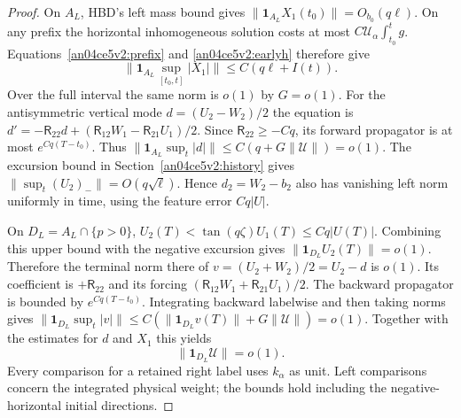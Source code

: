 \documentclass[11pt]{article}
\begin{document}
\begin{proof}
On $A_L$, HBD's left mass bound gives $\|\mathbf1_{A_L}X_1(t_0)\|=O_{b_0}(q\ell)$. On any prefix the horizontal inhomogeneous solution costs at most $C\mathcal U_\alpha\int_{t_0}^t g$. Equations~\eqref{an04ce5v2:prefix} and \eqref{an04ce5v2:earlyh} therefore give
\begin{equation}\label{an04ce5v2:left}
 \|\mathbf1_{A_L}\sup_{[t_0,t]} |X_1|\|\le C(q\ell+I(t)).
\end{equation}
Over the full interval the same norm is $o(1)$ by $G=o(1)$. For the antisymmetric vertical mode $d=(U_2-W_2)/2$ the equation is $d'=-\mathsf R_{22}d+(\mathsf R_{12} W_1-\mathsf R_{21}U_1)/2$. Since $\mathsf R_{22}\ge-Cq$, its forward propagator is at most $e^{Cq(T-t_0)}$. Thus $\|\mathbf1_{A_L}\sup_t|d|\|\le C(q+G\|\mathcal U\|)=o(1)$. The excursion bound in Section~\ref{an04ce5v2:history} gives $\|\sup_t (U_2)_-\|=O(q\sqrt\ell)$. Hence $d_2=W_2-b_2$ also has vanishing left norm uniformly in time, using the feature error $Cq|U|$.

On $D_L=A_L\cap\{p>0\}$, $U_2(T)<\tan(q\zeta) U_1(T)\le Cq|U(T)|$. Combining this upper bound with the negative excursion gives $\|\mathbf1_{D_L}U_2(T)\|=o(1)$. Therefore the terminal norm there of $v=(U_2+W_2)/2=U_2-d$ is $o(1)$. Its coefficient is $+\mathsf R_{22}$ and its forcing $(\mathsf R_{12}W_1+\mathsf R_{21}U_1)/2$. The backward propagator is bounded by $e^{Cq(T-t_0)}$. Integrating backward labelwise and then taking norms gives $\|\mathbf1_{D_L}\sup_t|v|\|\le C(\|\mathbf1_{D_L}v(T)\|+G\|\mathcal U\|)=o(1)$. Together with the estimates for $d$ and $X_1$ this yields
\begin{equation}\label{an04ce5v2:activeleft}
 \|\mathbf1_{D_L}\mathcal U\|=o(1).
\end{equation}
Every comparison for a retained right label uses $k_\alpha$ as unit. Left comparisons concern the integrated physical weight; the bounds hold including the negative-horizontal initial directions.
\end{proof}
\end{document}
